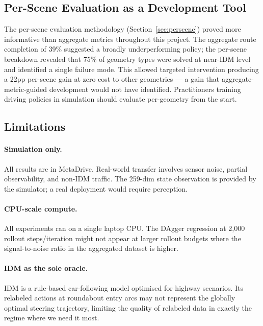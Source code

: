\documentclass{article}
\begin{document}
\subsection{Per-Scene Evaluation as a Development Tool}

The per-scene evaluation methodology (Section~\ref{sec:perscene}) proved
more informative than aggregate metrics throughout this project. The
aggregate route completion of 39\% suggested a broadly underperforming
policy; the per-scene breakdown revealed that 75\% of geometry types were
solved at near-IDM level and identified a single failure mode. This allowed
targeted intervention producing a 22pp per-scene gain at zero cost to other
geometries --- a gain that aggregate-metric-guided development would not have
identified. Practitioners training driving policies in simulation should
evaluate per-geometry from the start.

\subsection{Limitations}

\paragraph{Simulation only.}
All results are in MetaDrive. Real-world transfer involves sensor noise,
partial observability, and non-IDM traffic. The 259-dim state observation is
provided by the simulator; a real deployment would require perception.

\paragraph{CPU-scale compute.}
All experiments ran on a single laptop CPU. The DAgger regression at
2{,}000 rollout steps/iteration might not appear at larger rollout budgets
where the signal-to-noise ratio in the aggregated dataset is higher.

\paragraph{IDM as the sole oracle.}
IDM is a rule-based car-following model optimised for highway scenarios.
Its relabeled actions at roundabout entry arcs may not represent the
globally optimal steering trajectory, limiting the quality of relabeled data
in exactly the regime where we need it most.

\end{document}
